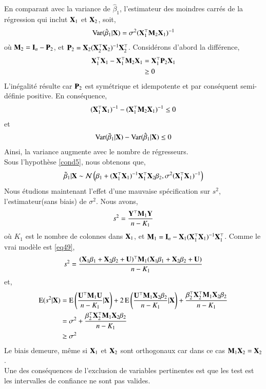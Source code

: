 \documentclass[10pt, reqno]{amsart}
\begin{document}
En comparant avec la variance de $\hat{\beta}_1$, l'estimateur des moindres carrés de la régression qui inclut $\mathbf X_1$ et $\mathbf X_2$, soit,
\begin{align*}
\operatorname{Var}(\hat{\beta}_1|\mathbf X) = \sigma^2(\mathbf X_1^\top\mathbf M_2\mathbf X_1)^{-1}
\end{align*}
où $\mathbf M_2 = \mathbf{I}_n - \mathbf P_2$, et $ \mathbf P_2 = \mathbf X_2(\mathbf X_2^\top\mathbf X_2)^{-1}\mathbf X_2^\top$. Considérons d'abord la différence,
\begin{align*}
\mathbf X_1^\top\mathbf X_1-\mathbf X_1^\top\mathbf M_2\mathbf X_1 &= \mathbf X_1^\top\mathbf P_2\mathbf X_1\\
&\geq 0
\end{align*}
L'inégalité résulte car $\mathbf P_2$ est symétrique et idempotente et par conséquent semi-définie positive. En conséquence,
\begin{align*}
(\mathbf X_1^\top\mathbf X_1)^{-1} - (\mathbf X_1^\top\mathbf M_2\mathbf X_1)^{-1} \leq 0
\end{align*}
et
\begin{align*}
\operatorname{Var}(\tilde{\beta}_1|\mathbf X) - \operatorname{Var}(\hat{\beta}_1|\mathbf X) \leq 0
\end{align*}
Ainsi, la variance augmente avec le nombre de régresseurs.\\
Sous l'hypothèse \ref{cond5}, nous obtenons que,
\begin{align*}
\tilde{\beta}_1 | \mathbf X \sim \mathcal{N}\left(\beta_1 + (\mathbf X_1^\top\mathbf X_1)^{-1}\mathbf X_1^\top\mathbf X_2\beta_2, \sigma^2(\mathbf X_1^\top\mathbf X_1)^{-1}\right)
\end{align*}
Nous étudions maintenant l'effet d'une mauvaise spécification sur $s^2$, l'estimateur(sans biais) de $\sigma^2$. Nous avons,
\begin{align*}
s^2 = \frac{\mathbf Y^\top\mathbf M_1\mathbf Y}{n-K_1}
\end{align*}
où $K_1$ est le nombre de colonnes dans $\mathbf X_1$, et $\mathbf M_1 = \mathbf{I}_n - \mathbf X_1(\mathbf X_1^\top\mathbf X_1)^{-1}\mathbf X_1^\top$. Comme le vrai modèle est \eqref{eq49},
\begin{align*}
s^2 = \frac{(\mathbf X_1\beta_1 + \mathbf X_2\beta_2 + \mathbf U)^\top\mathbf M_1(\mathbf X_1\beta_1 + \mathbf X_2\beta_2 + \mathbf U)}{n-K_1}
\end{align*}
et,
\begin{align*}
\operatorname{E}(s^2|\mathbf X) &=\operatorname{E}\left(\frac{\mathbf U^\top\mathbf M_1\mathbf U}{n-K_1}|\mathbf X\right) + 2\operatorname{E}\left(\frac{\mathbf U^\top\mathbf M_1\mathbf X_2\beta_2}{n-K_1}| \mathbf X\right) +
\frac{\beta_2^\top\mathbf X_2^\top\mathbf M_1\mathbf X_2\beta_2}{n-K_1}\\
&=\sigma^2 + \frac{\beta_2^\top\mathbf X_2^\top\mathbf M_1\mathbf X_2\beta_2}{n-K_1}\\
&\geq \sigma^2
\end{align*}
Le biais demeure, même si $\mathbf X_1$ et $\mathbf X_2$ sont orthogonaux car dans ce cas $\mathbf M_1\mathbf X_2 = \mathbf X_2$. \\
Une des conséquences de l'exclusion de variables pertinentes est que les test est les intervalles de confiance ne sont pas valides.
\end{document}
